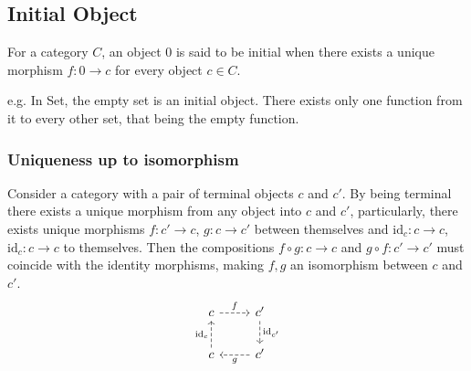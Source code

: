 \subsection{Initial Object}

For a category $C$, an object $0$ is said to be initial when there exists a
unique morphism $f: 0\to c$ for every object $c\in C$.
\parencite{awodey:category_theory}

e.g. In Set, the empty set is an initial object. There exists only one function
from it to every other set, that being the empty function.

\subsubsection*{Uniqueness up to isomorphism}

Consider a category with a pair of terminal objects $c$ and $c'$. By being
terminal there exists a unique morphism from any object into $c$ and $c'$,
particularly, there exists unique morphisms $f: c' \to c$, $g: c \to c'$ between
themselves and $\mathrm{id}_c: c\to c$, $\mathrm{id}_c: c\to c$ to themselves.
Then the compositions $f\circ g:c\to c$ and $g\circ f:c' \to c'$ must coincide
with the identity morphisms, making $f,g$ an isomorphism between $c$ and $c'$.
\[\begin{tikzcd}
	c & {c'} \\
	c & {c'}
	\arrow["{\mathrm{id}_c}", dashed, from=2-1, to=1-1]
	\arrow["f", dashed, from=1-1, to=1-2]
	\arrow["{\mathrm{id}_{c'}}", dashed, from=1-2, to=2-2]
	\arrow["g", dashed, from=2-2, to=2-1]
\end{tikzcd}\]